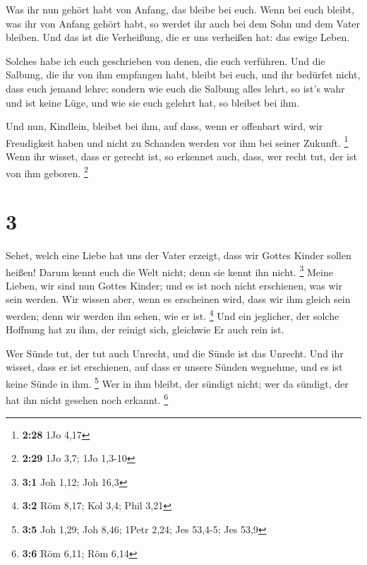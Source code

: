  Was ihr nun gehört habt von Anfang, das bleibe bei euch.
Wenn bei euch bleibt, was ihr von Anfang gehört habt, so werdet ihr auch
bei dem Sohn und dem Vater bleiben.  Und das ist die
Verheißung, die er uns verheißen hat: das ewige Leben.

 Solches habe ich euch geschrieben von denen, die euch
verführen.  Und die Salbung, die ihr von ihm empfangen
habt, bleibt bei euch, und ihr bedürfet nicht, dass euch jemand lehre;
sondern wie euch die Salbung alles lehrt, so ist's wahr und ist keine
Lüge, und wie sie euch gelehrt hat, so bleibet bei ihm.

 Und nun, Kindlein, bleibet bei ihm, auf dass, wenn er
offenbart wird, wir Freudigkeit haben und nicht zu Schanden werden vor
ihm bei seiner Zukunft. \footnote{\textbf{2:28} 1Jo 4,17}
 Wenn ihr wisset, dass er gerecht ist, so erkennet auch,
dass, wer recht tut, der ist von ihm geboren. \footnote{\textbf{2:29}
  1Jo 3,7; 1Jo 1,3-10}

\hypertarget{section-2}{%
\section{3}\label{section-2}}

 Sehet, welch eine Liebe hat uns der Vater erzeigt, dass
wir Gottes Kinder sollen heißen! Darum kennt euch die Welt nicht; denn
sie kennt ihn nicht. \footnote{\textbf{3:1} Joh 1,12; Joh 16,3}
 Meine Lieben, wir sind nun Gottes Kinder; und es ist noch
nicht erschienen, was wir sein werden. Wir wissen aber, wenn es
erscheinen wird, dass wir ihm gleich sein werden; denn wir werden ihn
sehen, wie er ist. \footnote{\textbf{3:2} Röm 8,17; Kol 3,4; Phil 3,21}
 Und ein jeglicher, der solche Hoffnung hat zu ihm, der
reinigt sich, gleichwie Er auch rein ist.

 Wer Sünde tut, der tut auch Unrecht, und die Sünde ist
das Unrecht.  Und ihr wisset, dass er ist erschienen, auf
dass er unsere Sünden wegnehme, und es ist keine Sünde in ihm.
\footnote{\textbf{3:5} Joh 1,29; Joh 8,46; 1Petr 2,24; Jes 53,4-5; Jes
  53,9}  Wer in ihm bleibt, der sündigt nicht; wer da
sündigt, der hat ihn nicht gesehen noch erkannt. \footnote{\textbf{3:6}
  Röm 6,11; Röm 6,14}

